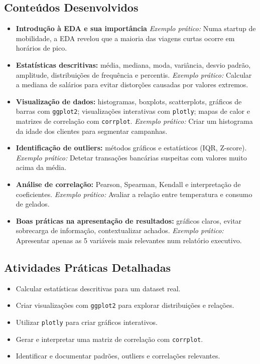 \subsection{\textcolor{subsectionblue}{Conteúdos Desenvolvidos}}
\begin{itemize}
  \item \textbf{Introdução à EDA e sua importância}  
  \textit{Exemplo prático:} Numa startup de mobilidade, a EDA revelou que a maioria das viagens curtas ocorre em horários de pico.
  \item \textbf{Estatísticas descritivas:} média, mediana, moda, variância, desvio padrão, amplitude, distribuições de frequência e percentis.  
  \textit{Exemplo prático:} Calcular a mediana de salários para evitar distorções causadas por valores extremos.
  \item \textbf{Visualização de dados:} histogramas, boxplots, scatterplots, gráficos de barras com \texttt{ggplot2}; visualizações interativas com \texttt{plotly}; mapas de calor e matrizes de correlação com \texttt{corrplot}.  
  \textit{Exemplo prático:} Criar um histograma da idade dos clientes para segmentar campanhas.
  \item \textbf{Identificação de outliers:} métodos gráficos e estatísticos (IQR, Z-score).  
  \textit{Exemplo prático:} Detetar transações bancárias suspeitas com valores muito acima da média.
  \item \textbf{Análise de correlação:} Pearson, Spearman, Kendall e interpretação de coeficientes.  
  \textit{Exemplo prático:} Avaliar a relação entre temperatura e consumo de gelados.
  \item \textbf{Boas práticas na apresentação de resultados:} gráficos claros, evitar sobrecarga de informação, contextualizar achados.  
  \textit{Exemplo prático:} Apresentar apenas as 5 variáveis mais relevantes num relatório executivo.
\end{itemize}

\subsection{\textcolor{subsectionblue}{Atividades Práticas Detalhadas}}
\begin{itemize}
  \item Calcular estatísticas descritivas para um dataset real.
  \item Criar visualizações com \texttt{ggplot2} para explorar distribuições e relações.
  \item Utilizar \texttt{plotly} para criar gráficos interativos.
  \item Gerar e interpretar uma matriz de correlação com \texttt{corrplot}.
  \item Identificar e documentar padrões, outliers e correlações relevantes.
\end{itemize}

